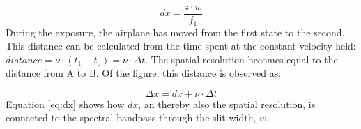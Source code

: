 \begin{equation}
    dx = \frac{z \cdot w}{f_1}
    \label{eq:dx}
\end{equation}
During the exposure, the airplane has moved from the first state to the second. This distance can be calculated from the time spent at the constant velocity held: $distance = \nu \cdot (t_1 - t_0) = \nu \cdot \Delta t$. The spatial resolution becomes equal to the distance from A to B. Of the figure, this distance is observed as: 

\begin{equation}
    \Delta x = dx + \nu \cdot \Delta t
    \label{eq:spares}
\end{equation}
\noindent
Equation \ref{eq:dx} shows how $dx$, an thereby also the spatial resolution, is connected to the spectral bandpass through the slit width, $w$. 






